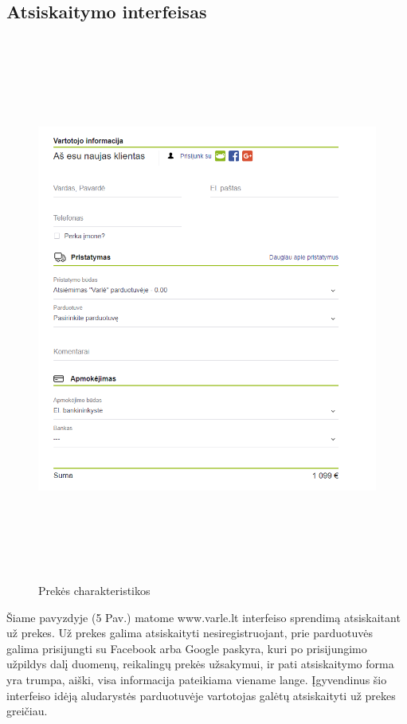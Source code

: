 \documentclass[oneside]{VUMIFPSkursinis}
\begin{document}
	\subsection{Atsiskaitymo interfeisas}
		\begin{figure}[h]
			\centering
			\includegraphics[width=12cm,height=18cm,keepaspectratio]{IkvepiantisInterfeisas5.png}
			\caption{ Prekės charakteristikos}
		\end{figure}

		Šiame pavyzdyje (5 Pav.) matome www.varle.lt interfeiso sprendimą atsiskaitant už prekes.
		Už prekes galima atsiskaityti nesiregistruojant, prie parduotuvės galima prisijungti su Facebook arba Google paskyra, kuri po prisijungimo užpildys dalį duomenų, reikalingų prekės užsakymui, ir pati atsiskaitymo forma yra trumpa, aiški, visa informacija pateikiama viename lange.
		Įgyvendinus šio interfeiso idėją aludarystės parduotuvėje vartotojas galėtų atsiskaityti už prekes greičiau.

\end{document}
